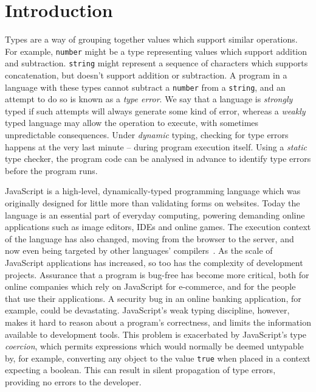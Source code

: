 \documentclass[12pt,a4paper,twoside,openright]{report}
\theoremstyle{definition}
\theoremstyle{dotless}
\newcommand*{\js}{\texttt}
\begin{document}
\chapter{Introduction}\label{introduction}

Types are a way of grouping together values which support similar operations.
For example, \texttt{number} might be a type representing values which support
addition and subtraction. \texttt{string} might represent a sequence of
characters which supports concatenation, but doesn't support addition or
subtraction. A program in a language with these types cannot subtract a
\texttt{number} from a \texttt{string}, and an attempt to do so is known as a
\textit{type error}. We say that a language is \textit{strongly} typed if such
attempts will always generate some kind of error, whereas a \textit{weakly}
typed language may allow the operation to execute, with sometimes
unpredictable consequences. Under \textit{dynamic} typing, checking for type
errors happens at the very last minute -- during program execution itself.
Using a \textit{static} type checker, the program code can be analysed in
advance to identify type errors before the program runs.

JavaScript is a high-level, dynamically-typed programming language which was
originally designed for little more than validating forms on websites. Today
the language is an essential part of everyday computing, powering demanding
online applications such as image editors, IDEs and online games. The
execution context of the language has also changed, moving from the browser to
the server, and now even being targeted by other languages'
compilers~\cite{asm}. As the scale of JavaScript applications has increased,
so too has the complexity of development projects. Assurance that a program is
bug-free has become more critical, both for online companies which rely on
JavaScript for e-commerce, and for the people that use their applications. A
security bug in an online banking application, for example, could be
devastating. JavaScript's weak typing discipline, however, makes it hard to
reason about a program's correctness, and limits the information available to
development tools. This problem is exacerbated by JavaScript's type
\textit{coercion}, which permits expressions which would normally be deemed
untypable by, for example, converting any object to the value \js{true} when
placed in a context expecting a boolean. This can result in silent propagation
of type errors, providing no errors to the developer.
\end{document}
